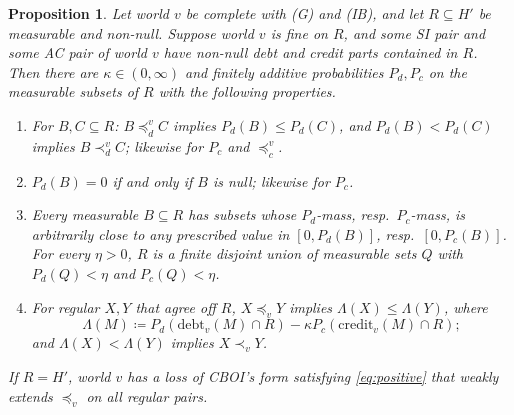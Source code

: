 \documentclass[11pt]{article}
\newtheorem{proposition}[theorem]{Proposition}
\theoremstyle{definition}\newtheorem{definition}[theorem]{Definition}
\theoremstyle{remark}\newtheorem{remark}[theorem]{Remark}
\newcommand{\debt}{\mathrm{debt}}
\newcommand{\cred}{\mathrm{credit}}
\begin{document}
\begin{proposition}\label{prop:localext}
Let world $v$ be complete with (G) and (IB), and let $R\subseteq H'$ be
measurable and non-null. Suppose world $v$ is fine on $R$, and some SI pair and some AC pair of world $v$ have non-null debt and credit parts
contained in $R$. Then there are $\kappa\in(0,\infty)$ and finitely additive
probabilities $P_d,P_c$ on the measurable subsets of $R$ with the following
properties.
\begin{enumerate}[label=(\roman*)]
\item For $B,C\subseteq R$: $B\preceq^v_dC$ implies $P_d(B)\le P_d(C)$, and
$P_d(B)<P_d(C)$ implies $B\prec^v_dC$; likewise for $P_c$ and
$\preceq^v_c$.
\item $P_d(B)=0$ if and only if $B$ is null; likewise for $P_c$.
\item Every measurable $B\subseteq R$ has subsets whose $P_d$-mass, resp.\
$P_c$-mass, is arbitrarily close to any prescribed value in $[0,P_d(B)]$,
resp.\ $[0,P_c(B)]$. For every $\eta>0$, $R$ is a finite disjoint union of
measurable sets $Q$ with $P_d(Q)<\eta$ and $P_c(Q)<\eta$.
\item For regular $X,Y$ that agree off $R$, $X\preceq_vY$ implies
$\Lambda(X)\le\Lambda(Y)$, where
\[
 \Lambda(M)\coloneqq P_d(\debt_v(M)\cap R)-\kappa P_c(\cred_v(M)\cap R);
\]
and $\Lambda(X)<\Lambda(Y)$ implies $X\prec_vY$.
\end{enumerate}
If $R=H'$, world $v$ has a loss of CBOI's form satisfying
\eqref{eq:positive} that weakly extends $\preceq_v$ on all regular pairs.
\end{proposition}
\end{document}
